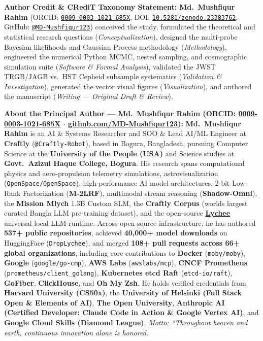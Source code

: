 \documentclass[11pt,letterpaper]{article}
\newcommand{\takeaway}[2]{%
  \vspace{6pt}%
  \noindent\colorbox{boxbg}{%
    \parbox{\dimexpr\textwidth-2\fboxsep\relax}{%
      \vspace{5pt}\textbf{\color{primary}#1:}\hspace{0.4em}#2\vspace{5pt}%
    }%
  }%
  \vspace{6pt}%
}
\begin{document}
\noindent\textbf{Author Credit \& CRediT Taxonomy Statement:} \textbf{Md.\ Mushfiqur Rahim} (ORCID: \href{https://orcid.org/0009-0003-1021-685X}{\texttt{0009-0003-1021-685X}}, DOI: \href{https://doi.org/10.5281/zenodo.23383762}{\texttt{10.5281/zenodo.23383762}}, GitHub: \href{https://github.com/MD-Mushfiqur123}{\texttt{@MD-Mushfiqur123}}) conceived the study, formulated the theoretical and statistical research questions (\emph{Conceptualization}), designed the multi-probe Bayesian likelihoods and Gaussian Process methodology (\emph{Methodology}), engineered the numerical Python MCMC, nested sampling, and cosmographic simulation suite (\emph{Software \& Formal Analysis}), validated the JWST TRGB/JAGB vs.\ HST Cepheid subsample systematics (\emph{Validation \& Investigation}), generated the vector visual figures (\emph{Visualization}), and authored the manuscript (\emph{Writing --- Original Draft \& Review}).

\takeaway{About the Principal Author --- Md.\ Mushfiqur Rahim (ORCID: \href{https://orcid.org/0009-0003-1021-685X}{0009-0003-1021-685X} $\cdot$ \href{https://github.com/MD-Mushfiqur123}{github.com/MD-Mushfiqur123})}{%
\textbf{Md.\ Mushfiqur Rahim} is an AI \& Systems Researcher and SOO \& Lead AI/ML Engineer at \textbf{Craftly} (\texttt{@Craftly-Robot}), based in Bogura, Bangladesh, pursuing Computer Science at the \textbf{University of the People (USA)} and Science studies at \textbf{Govt.\ Azizul Haque College, Bogura}. His research spans computational physics and aero-propulsion telemetry simulations, astrovisualization (\texttt{OpenSpace/OpenSpace}), high-performance AI model architectures, 2-bit Low-Rank Factorization (\textbf{M-2LRF}), multimodal stream reasoning (\textbf{Shadow-Omni}), the \textbf{Mission Mlych} 1.3B Custom SLM, the \textbf{Craftly Corpus} (world\textquotesingle s largest curated Bangla LLM pre-training dataset), and the open-source \href{https://github.com/MD-Mushfiqur123/lychee}{\textbf{Lychee}} universal local LLM runtime. Across open-source infrastructure, he has authored \textbf{537+ public repositories}, achieved \textbf{40,000+ model downloads} on HuggingFace (\texttt{DropLychee}), and merged \textbf{108+ pull requests across 66+ global organizations}, including core contributions to \textbf{Docker} (\texttt{moby/moby}), \textbf{Google} (\texttt{google/go-cmp}), \textbf{AWS Labs} (\texttt{awslabs/mcp}), \textbf{CNCF Prometheus} (\texttt{prometheus/client\_golang}), \textbf{Kubernetes etcd Raft} (\texttt{etcd-io/raft}), \textbf{GoFiber}, \textbf{ClickHouse}, and \textbf{Oh My Zsh}. He holds verified credentials from \textbf{Harvard University (CS50x)}, the \textbf{University of Helsinki (Full Stack Open \& Elements of AI)}, \textbf{The Open University}, \textbf{Anthropic AI (Certified Developer: Claude Code in Action \& Google Vertex AI)}, and \textbf{Google Cloud Skills (Diamond League)}. \emph{Motto: ``Throughout heaven and earth, continuous innovation alone is honored.}
}
\end{document}
